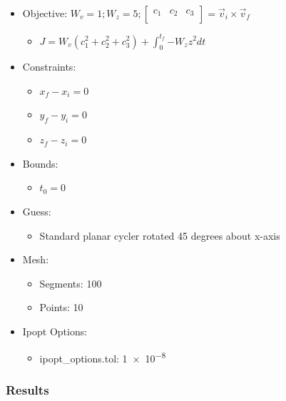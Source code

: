 \documentclass{article}
\begin{document}
\begin{itemize}
    \item Objective: $W_v = 1; W_z = 5; \left[\begin{matrix}c_1&c_2&c_3\\\end{matrix}\right] = \vec{v}_i\times\vec{v}_f$
    \begin{itemize}
        \item $J = W_v\left(c_1^2 + c_2^2 + c_3^2\right) + \int_{0}^{t_f}{-W_zz^2dt}$
    \end{itemize}
    \item Constraints:
    \begin{itemize}
        \item $x_f - x_i = 0$
        \item $y_f - y_i = 0$
        \item $z_f - z_i = 0$
    \end{itemize}
    \item Bounds:
    \begin{itemize}
        \item $t_0 = 0$
    \end{itemize}
    \item Guess:
    \begin{itemize}
        \item Standard planar cycler rotated 45 degrees about x-axis
    \end{itemize}
    \item Mesh:
    \begin{itemize}
        \item Segments: 100
        \item Points: 10
    \end{itemize}
    \item Ipopt Options:
    \begin{itemize}
        \item ipopt\_options.tol: \num{1e-8}
    \end{itemize}
\end{itemize}

\subsubsection{Results}
\end{document}
